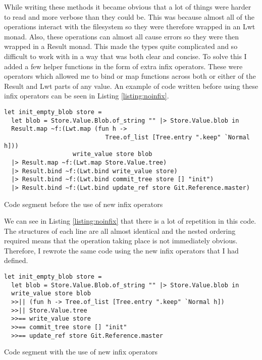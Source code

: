 While writing these methods it became obvious that a lot of things were harder to read and more verbose than they could be. This was because almost all of the operations interact with the filesystem so they were therefore wrapped in an Lwt monad. Also, these operations can almost all cause errors so they were then wrapped in a Result monad. This made the types quite complicated and so difficult to work with in a way that was both clear and concise. To solve this I added a few helper functions in the form of extra infix operators. These were operators which allowed me to bind or map functions across both or either of the Result and Lwt parts of any value. An example of code written before using these infix operators can be seen in Listing \ref{listing:noinfix}.

\begin{listing}[h]
\begin{verbatim}
let init_empty_blob store =
  let blob = Store.Value.Blob.of_string "" |> Store.Value.blob in
  Result.map ~f:(Lwt.map (fun h ->
                            Tree.of_list [Tree.entry ".keep" `Normal h]))
                   write_value store blob
  |> Result.map ~f:(Lwt.map Store.Value.tree)
  |> Result.bind ~f:(Lwt.bind write_value store)
  |> Result.bind ~f:(Lwt.bind commit_tree store [] "init")
  |> Result.bind ~f:(Lwt.bind update_ref store Git.Reference.master)
\end{verbatim}
\caption{Code segment before the use of new infix operators}
\label{listing:noinfix}
\end{listing}

We can see in Listing \ref{listing:noinfix} that there is a lot of repetition in this code. The structures of each line are all almost identical and the nested ordering required means that the operation taking place is not immediately obvious. Therefore, I rewrote the same code using the new infix operators that I had defined.

\begin{listing}[h]
\begin{verbatim}
let init_empty_blob store =
  let blob = Store.Value.Blob.of_string "" |> Store.Value.blob in
  write_value store blob
  >>|| (fun h -> Tree.of_list [Tree.entry ".keep" `Normal h])
  >>|| Store.Value.tree
  >>== write_value store
  >>== commit_tree store [] "init"
  >>== update_ref store Git.Reference.master
\end{verbatim}
\caption{Code segment with the use of new infix operators}
\label{listing:infix}
\end{listing}

